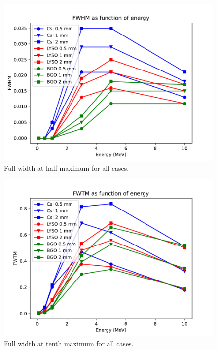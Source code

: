 \documentclass{article}
\begin{document}
\begin{figure}[H]
    \centering
    \includegraphics[width=0.8\linewidth]{images/task5/FWHM_all.pdf}
    \caption{Full width at half maximum for all cases.}
\end{figure}
\begin{figure}[H]
    \centering
    \includegraphics[width=0.8\linewidth]{images/task5/FWTM_all.pdf}
    \caption{Full width at tenth maximum for all cases.}
\end{figure}
\end{document}
